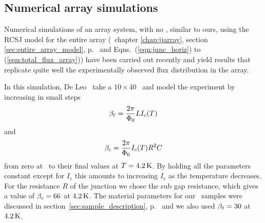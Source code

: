 \subsection{Numerical array simulations}
\label{sec:num_array_sims}

Numerical simulations of an array system,
with no \pijunctions, similar to ours,
using the RCSJ model for the entire array (\cf\ chapter \ref{chap:jjarray},
section \ref{sec:entire_array_model}, p.~\pageref{sec:entire_array_model}
and  Eqns.~(\ref{eqn:junc_horiz}) to 
(\ref{eqn:total_flux_array})) have been carried out recently
\cite{deleo_unpublished} and yield results that replicate quite
well the experimentally observed flux distribution in the array.

In this simulation, De Leo \etal\ take a $10\times 40$ 
\jja\ and model the experiment by increasing in small steps
%
\begin{equation}
\betal= {2 \pi \over \Phinot} L I_c(T) 
\end{equation}
%
and
%
\begin{equation}
\betac= {2 \pi \over \Phinot} I_c(T) R^2  C 
\end{equation}
%
from zero at \tc\ to their final values at $T=4.2\,\kelvin$.
By holding all the parameters constant except for $I_c$ this
amounts to increasing $I_c$ as the temperature decreases.
For the resistance $R$ of the junction we chose the sub
gap resistance, which gives a value of $\betac = 66$ at 
$4.2\,\kelvin$. The material parameters for our \jja\ samples
were discussed in section~\ref{sec:sample_description},
p.~\pageref{sec:sample_description} and we also used
$\betal=30$ at $4.2\,\kelvin$.

